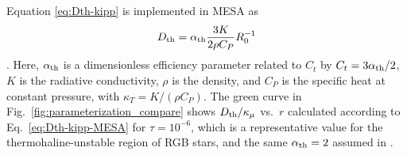 Equation \eqref{eq:Dth-kipp} is implemented in MESA as
\begin{equation} \label{eq:Dth-kipp-MESA}
    \Dth = \alpha_{\rm{th}} \frac{3 K}{2\rho C_P}R_0^{-1}
\end{equation}
\citep[see Eq.~(14) of][]{mesa2}. 
Here, $\alpha_{\rm{th}}$ is a dimensionless efficiency parameter related to $C_t$ by $C_t = 3\alpha_{\rm{th}}/2$, $K$ is the radiative conductivity, $\rho$ is the density, and $C_P$ is the specific heat at constant pressure, with $\kappa_T = K/(\rho C_P)$. 
The green curve in Fig.~\ref{fig:parameterization_compare} shows $D_\mathrm{th}/\kappa_\mu$ vs.~$r$ calculated according to Eq.~\eqref{eq:Dth-kipp-MESA} for $\tau = 10^{-6}$, which is a representative value for the thermohaline-unstable region of RGB stars, and the same $\alpha_{\rm{th}} = 2$ assumed in \citet{CantielloLanger}.

